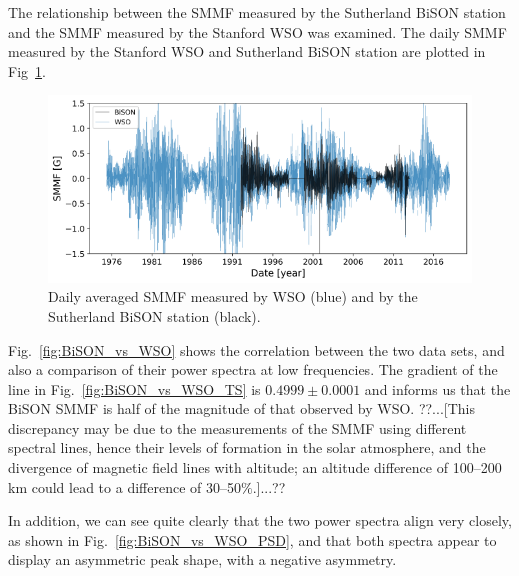 The relationship between the SMMF measured by the Sutherland BiSON station and the SMMF measured by the Stanford WSO was examined. The daily SMMF measured by the Stanford WSO and Sutherland BiSON station are plotted in Fig~\ref{fig:BiSON_and_WSO}.

\begin{figure}[ht!]
    \centering
	\includegraphics[width=\columnwidth]{BiSON_and_WSO.pdf}
    \caption{Daily averaged SMMF measured by WSO (blue) and by the Sutherland BiSON station (black).}
    \label{fig:BiSON_and_WSO}
\end{figure}

Fig.~\ref{fig:BiSON_vs_WSO} shows the correlation between the two data sets, and also a comparison of their power spectra at low frequencies. The gradient of the line in Fig.~\ref{fig:BiSON_vs_WSO_TS} is $0.4999\pm0.0001$ and informs us that the BiSON SMMF is half of the magnitude of that observed by WSO. ??...[This discrepancy may be due to the measurements of the SMMF using different spectral lines, hence their levels of formation in the solar atmosphere, and the divergence of magnetic field lines with altitude; an altitude difference of 100--200 km could lead to a difference of 30--50$\%$.]...??

In addition, we can see quite clearly that the two power spectra align very closely, as shown in Fig.~\ref{fig:BiSON_vs_WSO_PSD}, and that both spectra appear to display an asymmetric peak shape, with a negative asymmetry.


